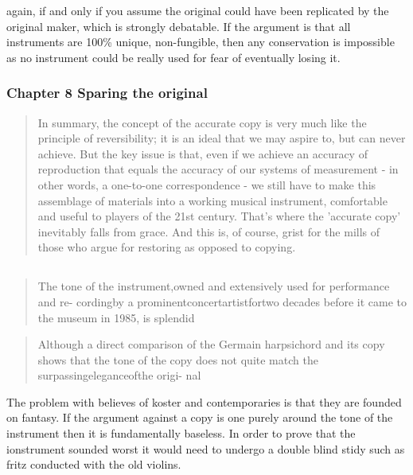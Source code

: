 again, if and only if you assume the original could have been replicated by the
original maker, which is strongly debatable. If the argument is that all
instruments are 100\% unique, non-fungible, then any conservation is impossible
as no instrument could be really used for fear of eventually losing it.

\subsubsection{Chapter 8 Sparing the original}

\begin{quotation}
    In summary, the concept of the accurate copy is very much like the principle
    of reversibility; it is an ideal that we may aspire to, but can never
    achieve. But the key issue is that, even if we achieve an accuracy of
    reproduction that equals the accuracy of our systems of measurement - in
    other words, a one-to-one correspondence - we still have to make this
    assemblage of materials into a working musical instrument, comfortable and
    useful to players of the 21st century. That's where the 'accurate copy'
    inevitably falls from grace. And this is, of course, grist for the mills of
    those who argue for restoring as opposed to copying.
\end{quotation}

\subsection{\cite{koster_restoration_1996}}


\begin{quotation}
    The tone of the instrument,owned and extensively used for performance and
re- cordingby a prominentconcertartistfortwo decades before it came to the
museum in 1985, is splendid
\end{quotation}

\begin{quotation}
    Although a direct comparison of the Germain harpsichord and its copy shows
that the tone of the copy does not quite match the surpassingeleganceofthe
origi- nal
\end{quotation}

The problem with believes of koster and contemporaries is that they are founded
on fantasy. If the argument against a copy is one purely around the tone of the
instrument then it is fundamentally baseless. In order to prove that the
ionstrument sounded worst it would need to undergo a double  blind stidy such as
fritz conducted with the old violins.

